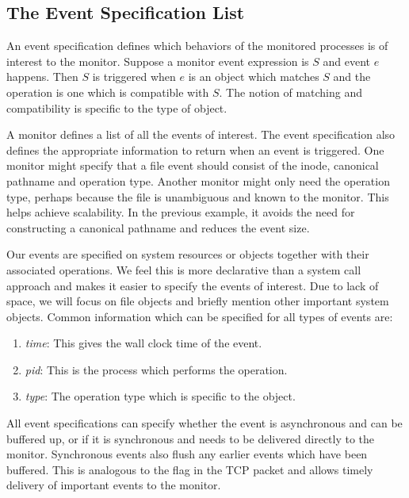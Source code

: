 \subsection{The Event Specification List}

An event specification defines which behaviors
of the monitored processes is of interest to the monitor.
Suppose a monitor event expression is $S$
and event $e$ happens. Then $S$ is triggered when $e$ is an object 
which matches $S$ and the operation is one which is compatible with $S$.
The notion of matching and compatibility is specific to the type of object.

A monitor defines a list of all the events of interest.
The event specification also defines the appropriate
information to return when an event is triggered.
One monitor might specify that a file event should 
consist of the inode, canonical pathname and operation type.
Another monitor might only need the operation type, perhaps because
the file is unambiguous and known to the monitor.
This helps achieve scalability. In the previous example,
it avoids the need for constructing a canonical
pathname and reduces the event size.

Our events are specified on system resources or objects together with their
associated operations. 
We feel this is more declarative than a system call approach
and makes it easier to specify the events of interest.
Due to lack of space, we will focus on file objects and briefly mention
other important system objects.
Common information which can be specified
for all types of events are:
\begin{enumerate}
\item {\em time}:
This gives the wall clock time of the event.
\item {\em pid}:
This is the process which performs the operation.
\item {\em type}:
The operation type which is specific to the object.
\end{enumerate}

All event specifications can 
specify whether the event is asynchronous and can be buffered up,
or if it is synchronous and needs to be delivered directly to the monitor.
Synchronous events also flush any earlier events which have been buffered.
This is analogous to the  flag in the TCP packet
and allows timely delivery of important events to the monitor.

